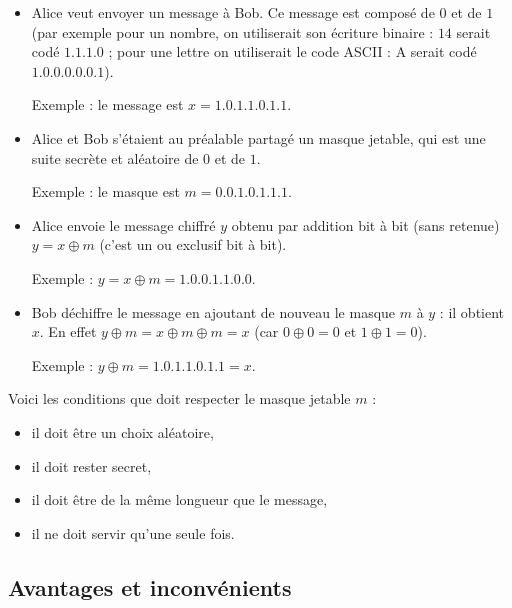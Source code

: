 \documentclass[11pt,class=report,crop=false]{standalone}
\begin{document}
\begin{itemize}
  \item Alice veut envoyer un message à Bob. Ce message est composé de $0$ et de $1$ (par exemple pour un nombre, on utiliserait son écriture binaire : $14$ serait codé $1.1.1.0$ ; pour une lettre on utiliserait le code ASCII :  \og{}A\fg{} serait codé $1.0.0.0.0.0.1$).

  Exemple : le message est $x = 1.0.1.1.0.1.1$.

  \item Alice et Bob s'étaient au préalable partagé un \og{}masque jetable\fg{}, qui est une suite secrète et aléatoire de $0$ et de $1$.

 Exemple : le masque est $m = 0.0.1.0.1.1.1$.

\medskip


\medskip

  \item Alice envoie le message chiffré $y$ obtenu par addition bit à bit (sans retenue) $y = x \oplus m$ (c'est un \og{}ou exclusif\fg{} bit à bit).



 Exemple :  $y= x \oplus m = 1.0.0.1.1.0.0$.

  \item Bob déchiffre le message en ajoutant de nouveau le masque $m$ à $y$ : il obtient $x$.
  En effet $y \oplus m = x \oplus m \oplus m = x$ (car $0 \oplus 0 = 0$ et $1 \oplus 1 = 0$).

 Exemple :  $y \oplus m = 1.0.1.1.0.1.1 = x$.


\end{itemize}


Voici les conditions que doit respecter le masque jetable $m$ :
\begin{itemize}
  \item il doit être un choix aléatoire,
  \item il doit rester secret,
  \item il doit être de la même longueur que le message,
  \item il ne doit servir qu'une seule fois.
\end{itemize}


\subsection{Avantages et inconvénients}
\end{document}
